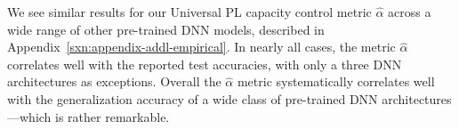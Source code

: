 We see similar results for our Universal PL capacity control metric $\hat{\alpha}$ across a wide range of other pre-trained DNN models, described in Appendix~\ref{sxn:appendix-addl-empirical}.
In nearly all cases, the metric $\hat{\alpha}$ correlates well with the reported test accuracies, with only a three DNN architectures as exceptions. 
Overall the $\hat{\alpha}$ metric systematically correlates well with the generalization accuracy of a wide class of pre-trained DNN architectures---which is rather remarkable.

